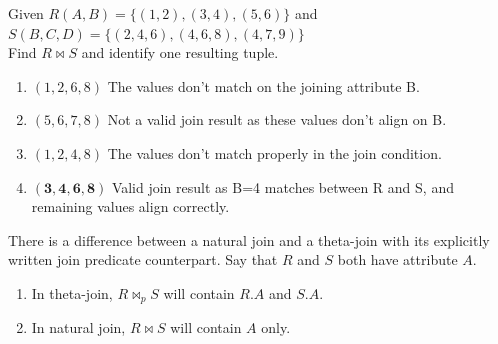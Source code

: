     \begin{example}
      \label{ex:natural-join-operation}
      Given $R(A,B) = \{(1,2), (3,4), (5,6)\}$ and\\
      $S(B,C,D) = \{(2,4,6), (4,6,8), (4,7,9)\}$\\
      Find $R \bowtie S$ and identify one resulting tuple.

      \begin{enumerate}
        \item $(1,2,6,8)$ The values don't match on the joining attribute B.
        
        \item $(5,6,7,8)$ Not a valid join result as these values don't align on B.
        
        \item $(1,2,4,8)$ The values don't match properly in the join condition.
        
        \item $\mathbf{(3,4,6,8)}$ Valid join result as B=4 matches between R and S, and remaining values align correctly.
      \end{enumerate}
    \end{example}

    \begin{lemma}
      \label{thm:deletion-of-duplicate-attribute-in-natural-join}
      There is a difference between a natural join and a theta-join with its explicitly written join predicate counterpart. Say that $R$ and $S$ both have attribute $A$. 
      \begin{enumerate}
        \item In theta-join, $R \bowtie_p S$ will contain $R.A$ and $S.A$. 
        \item In natural join, $R \bowtie S$ will contain $A$ only. 
      \end{enumerate}
    \end{lemma}

